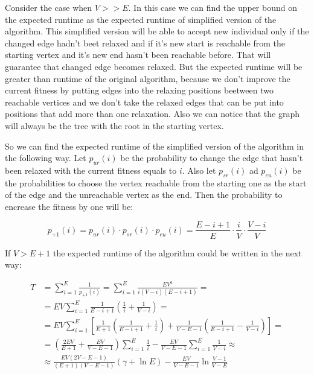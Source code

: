 \documentclass[a4paper]{article}
\begin{document}
 
 Consider the case when $V >> E$. In this case we can find the upper bound on the expected runtime as the expected runtime of simplified version of the algorithm. This simplified version will be able to accept new individual only if the changed edge hadn't beet relaxed and if it's new start is reachable from the starting vertex and it's new end hasn't been reachable before. That will guarantee that changed edge becomes relaxed. But the expected runtime will be greater than runtime of the original algorithm, because we don't improve the current fitness by putting edges into the relaxing positions beetween two reachable vertices and we don't take the relaxed edges that can be put into positions that add more than one relaxation. Also we can notice that the graph will always be the tree with the root in the starting vertex.
 
 So we can find the expected runtime of the simplified version of the algorithm in the following way. Let $p_{ur}(i)$ be the probability to change the edge that hasn't been relaxed with the current fitness equals to $i$. Also let $p_{sr}(i)$ ad $p_{eu}(i)$ be the probabilities to choose the vertex reachable from the starting one as the start of the edge and the unreachable vertex as the end.
 Then the probability to encrease the fitness by one will be:
 
 $$ p_{+1}(i) = p_{ur}(i) \cdot p_{sr}(i) \cdot p_{eu}(i) = \frac{E - i + 1}{E} \cdot \frac{i}{V} \cdot \frac{V - i}{V}$$
 
 If $V > E + 1$ the expected runtime of the algorithm could be written in the next way:
 
 \begin{align*}
  T & = \sum_{i = 1}^E \frac{1}{p_{+1}(i)} = \sum_{i = 1}^E \frac{EV^2}{i(V - i)(E - i + 1)} = \\
    & = EV \sum_{i = 1}^E \frac{1}{E - i + 1} \left(\frac{1}{i} + \frac{1}{V - i} \right) = \\
    & = EV \sum_{i = 1}^E \left[ \frac{1}{E + 1} \left( \frac{1}{E - i + 1} + \frac{1}{i}\right) + \frac{1}{V - E - 1} \left( \frac{1}{E - i + 1} - \frac{1}{V - i} \right)\right] = \\
    & = \left( \frac{2EV}{E + 1} + \frac{EV}{V - E - 1}\right) \sum_{i = 1}^E \frac{1}{i} - \frac{EV}{V - E - 1} \sum_{i = 1}^E \frac{1}{V - i} \approx \\
    & \approx \frac{EV(2V - E - 1)}{(E + 1)(V - E - 1)}(\gamma + \ln{E}) - \frac{EV}{V - E - 1} \ln \frac{V - 1}{V - E}
 \end{align*}
 
\end{document}
